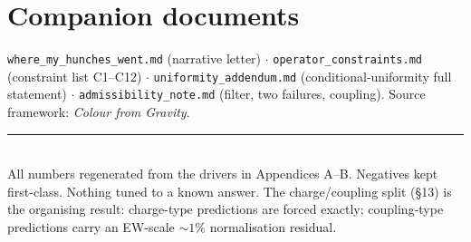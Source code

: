 \documentclass[11pt]{article}
\begin{document}
\section{Companion documents}
\texttt{where\_my\_hunches\_went.md} (narrative letter) $\cdot$ \texttt{operator\_constraints.md} (constraint list C1--C12) $\cdot$ \texttt{uniformity\_addendum.md} (conditional-uniformity full statement) $\cdot$ \texttt{admissibility\_note.md} (filter, two failures, coupling). Source framework: \emph{Colour from Gravity}.

\vspace{1em}
\noindent\rule{\textwidth}{0.4pt}\\
\small All numbers regenerated from the drivers in Appendices A--B. Negatives kept first-class. Nothing tuned to a known answer. The charge/coupling split (\S13) is the organising result: charge-type predictions are forced exactly; coupling-type predictions carry an EW-scale $\sim1\%$ normalisation residual.
\end{document}
